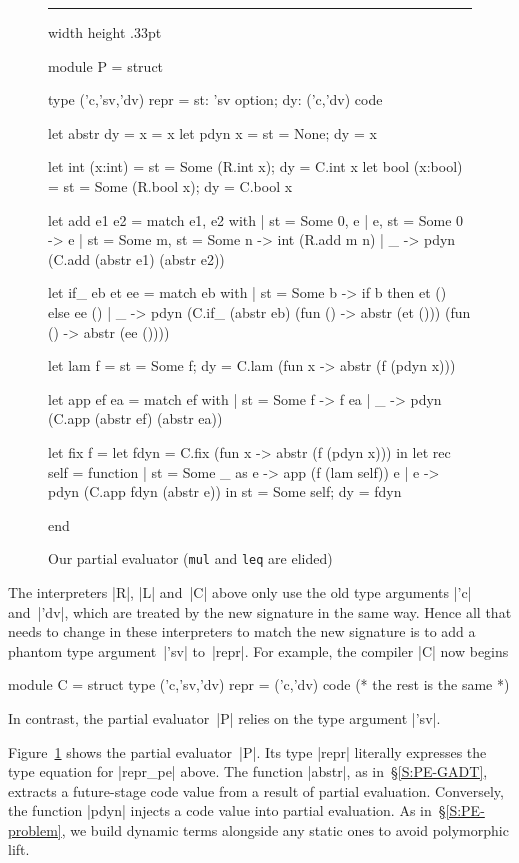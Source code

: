 \documentclass[preprint]{sigplanconf}
\newenvironment{floatrule}
    {\hrule width \hsize height .33pt \vspace{.5pc}}
    {\par\addvspace{1ex}}
\begin{document}
\begin{figure}
\begin{floatrule}
\begin{code}
module P = struct

  type ('c,'sv,'dv) repr = {st: 'sv option;
                            dy: ('c,'dv) code}

  let abstr {dy = x} = x
  let pdyn x = {st = None; dy = x}

  let int  (x:int)  = {st = Some (R.int x);
                       dy = C.int x}
  let bool (x:bool) = {st = Some (R.bool x);
                       dy = C.bool x}

  let add e1 e2 = match e1, e2 with
  | {st = Some 0}, e | e, {st = Some 0} -> e
  | {st = Some m}, {st = Some n} -> int (R.add m n)
  | _ -> pdyn (C.add (abstr e1) (abstr e2))

  let if_ eb et ee = match eb with
  | {st = Some b} -> if b then et () else ee ()
  | _ -> pdyn (C.if_ (abstr eb) 
                     (fun () -> abstr (et ()))
                     (fun () -> abstr (ee ())))

  let lam f =
  {st = Some f; 
   dy = C.lam (fun x -> abstr (f (pdyn x)))}

  let app ef ea = match ef with
  | {st = Some f} -> f ea
  | _ -> pdyn (C.app (abstr ef) (abstr ea))

  let fix f = 
    let fdyn = C.fix (fun x -> abstr (f (pdyn x)))
    in let rec self = function
       | {st = Some _} as e -> app (f (lam self)) e
       | e -> pdyn (C.app fdyn (abstr e))
       in {st = Some self; dy = fdyn}

end
\end{code}
\end{floatrule}
\caption{Our partial evaluator (\texttt{mul} and \texttt{leq} are elided)}
\label{fig:pe}
\end{figure}

The interpreters |R|, |L| and~|C| above only use the old
type arguments |'c| and~|'dv|, which are treated by the new signature
in the same way.  Hence all that needs to change in these interpreters
to match the new signature is to add a phantom type
argument~|'sv| to~|repr|.
For example, the compiler |C| now begins
\begin{code}
module C = struct
  type ('c,'sv,'dv) repr = ('c,'dv) code
  (* the rest is the same *)
\end{code}
In contrast, the partial evaluator~|P| relies on the type argument |'sv|.

Figure~\ref{fig:pe} shows the partial evaluator~|P|.
Its type |repr| literally expresses the type equation for |repr_pe| above.
The function |abstr|, as in~\S\ref{S:PE-GADT},
extracts a future-stage code value from a result of
partial evaluation.  Conversely, the function |pdyn| injects a
code value into partial evaluation. As
in~\S\ref{S:PE-problem}, we build dynamic terms alongside
any static ones to avoid polymorphic lift.
\end{document}
